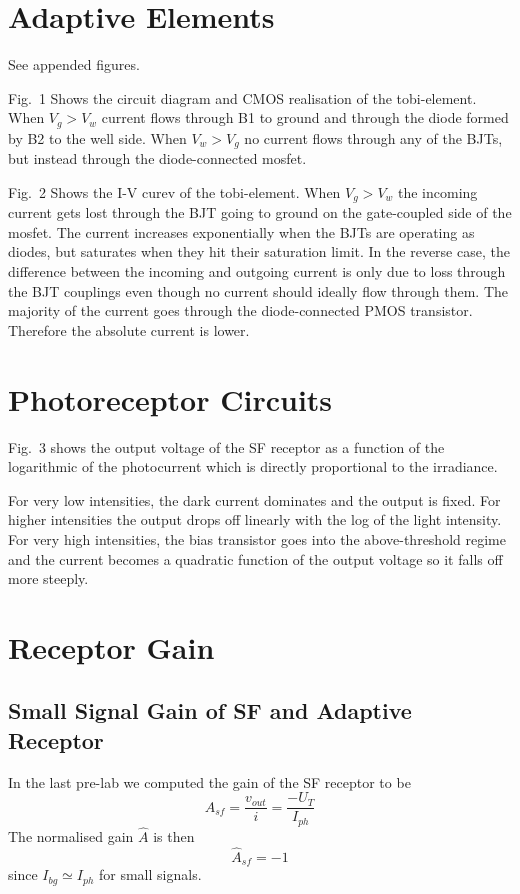 


\newpage
\section{Adaptive Elements}
See appended figures.

Fig.~1 Shows the circuit diagram and CMOS realisation of the tobi-element. When \(V_g > V_w\) current flows through B1 to ground
and through the diode formed by B2 to the well side. When \(V_w > V_g\) no current flows through any of the BJTs, but instead
through the diode-connected mosfet. 

Fig.~2 Shows the I-V curev of the tobi-element. When \(V_g>V_w\) the incoming current gets lost through the BJT going to ground
on the gate-coupled side of the mosfet. The current increases exponentially when the BJTs are operating as diodes, but saturates
when they hit their saturation limit. In the reverse case, the difference between the incoming and outgoing current is only due
to loss through the BJT couplings even though no current should ideally flow through them. The majority of the current goes through
the diode-connected PMOS transistor. Therefore the absolute current is lower.

\section{Photoreceptor Circuits}
Fig.~3 shows the output voltage of the SF receptor as a function of the logarithmic of the photocurrent which is directly proportional
to the irradiance. 

For very low intensities, the dark current dominates and the output is fixed. For higher intensities the output drops off linearly
with the log of the light intensity. For very high intensities, the bias transistor goes into the above-threshold regime and the
current becomes a quadratic function of the output voltage so it falls off more steeply.

\section{Receptor Gain}
\subsection{Small Signal Gain of SF and Adaptive Receptor}
In the last pre-lab we computed the gain of the SF receptor to be
\begin{equation*}
    A_{sf} = \frac{v_{out}}{i} = \frac{-U_T}{I_{ph}}
\end{equation*}
The normalised gain \(\hat{A}\) is then
\begin{equation*}
    \hat{A}_{sf} = -1
\end{equation*}
since \(I_{bg} \simeq I_{ph}\) for small signals.

